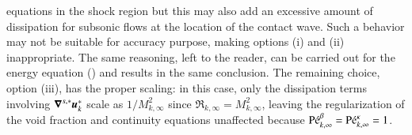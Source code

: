 \documentclass[preprint,10pt]{elsarticle}
\begin{document}
{equations in the shock region but this may also add an excessive amount of dissipation for subsonic 
flows at the location of the contact wave. Such a behavior may not be suitable for accuracy purpose, 
making options (i) and (ii) inappropriate. The same reasoning, left to the reader, can be carried out 
for the energy equation () and results in the same conclusion. The remaining 
choice, option (iii), has the proper scaling: in this case, only the dissipation terms involving 
$\boldsymbol\nabla^{s,*} \boldsymbol u_k^*$ scale as $1/M_{k,\infty}^2$ since $\Re_{k,\infty} = M_{k,\infty}^2$, leaving the 
regularization of the void fraction and continuity equations unaffected because $\textrm{P\'e}_{k,\infty}^\beta = \textrm{P\'e}_{k,\infty}^\kappa =1$.
  
%
}
\end{document}
